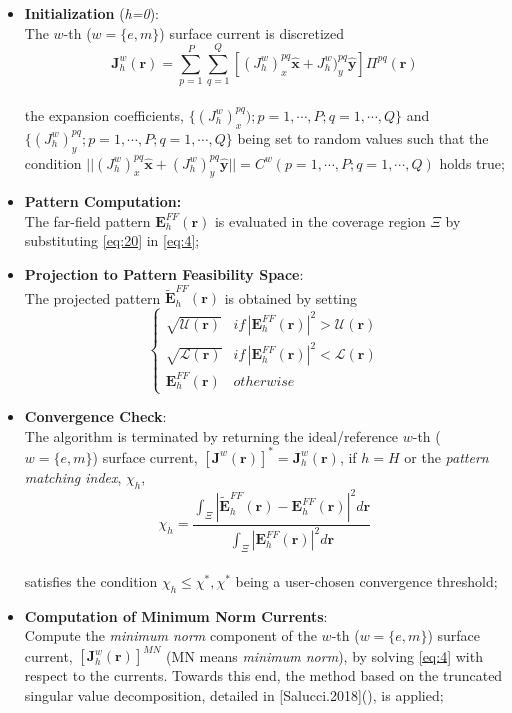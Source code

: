 \begin{itemize}
\item \textbf{Initialization} (\emph{h=0}):\\
The $w$-th ($w=\{ e,m\}$) surface current is discretized\begin{equation}
\mathbf{J}_{h}^{w}(\mathbf{r})=\sum_{p=1}^{P}\sum_{q=1}^{Q}[(J_{h}^{w})_{x}^{pq}\mathbf{\hat{x}}+J_{h}^{w})_{y}^{pq}\mathbf{\hat{y}}]\Pi^{pq}(\mathbf{r})\label{eq:20}\end{equation}
\\
the expansion coefficients, $\{(J_{h}^{w})_{x}^{pq});p=1,\cdots,P;q=1,\cdots,Q\}$
and $\{(J_{h}^{w})_{y}^{pq};p=1,\cdots,P;q=1,\cdots,Q\}$ being set
to random values such that the condition $||(J_{h}^{w})_{x}^{pq}\mathbf{\hat{x}}+(J_{h}^{w})_{y}^{pq}\mathbf{\hat{y}}||=C^{w}(p=1,\cdots,P;q=1,\cdots,Q)$
holds true;
\item \textbf{Pattern Computation:}\\
The far-field pattern $\mathbf{E}_{h}^{FF}(\mathbf{r})$ is evaluated
in the coverage region $\Xi$ by substituting \ref{eq:20} in \ref{eq:4};
\item \textbf{Projection to Pattern Feasibility Space}:\\
The projected pattern $\mathbf{\tilde{E}}_{h}^{FF}(\mathbf{r})$ is
obtained by setting \begin{equation}
\left\{ \begin{array}{cc}
\sqrt{\mathcal{U}(\mathbf{r})} & if\,|\mathbf{E}_{h}^{FF}(\mathbf{r})|^{2}>\mathcal{U}(\mathbf{r})\\
\sqrt{\mathcal{L}(\mathbf{r})} & if\,|\mathbf{E}_{h}^{FF}(\mathbf{r})|^{2}<\mathcal{L}(\mathbf{r})\\
\mathbf{\mathbf{E}}_{h}^{FF}(\mathbf{r}) & otherwise\end{array}\right.\label{eq:21}\end{equation}

\item \textbf{Convergence Check}:\\
The algorithm is terminated by returning the ideal/reference $w$-th
($w=\{ e,m\}$) surface current, $[\mathbf{J}^{w}(\mathbf{r})]^{*}=\mathbf{J}_{h}^{w}(\mathbf{r})$,
if $h=H$ or the \emph{pattern matching index}, $\chi_{h}$,\begin{equation}
\chi_{h}=\frac{\int_{\Xi}|\mathbf{\tilde{E}}_{h}^{FF}(\mathbf{r})-\mathbf{E}_{h}^{FF}(\mathbf{r})|^{2}d\mathbf{r}}{\int_{\Xi}|\mathbf{E}_{h}^{FF}(\mathbf{r})|^{2}d\mathbf{r}}\label{eq:22}\end{equation}
\\
satisfies the condition $\chi_{h}\leq\chi^{*},\chi^{*}$ being a user-chosen
convergence threshold;
\item \textbf{Computation of Minimum Norm Currents}:\\
Compute the \emph{minimum norm} component of the $w$-th ($w=\{ e,m\}$)
surface current, $[\mathbf{J}_{h}^{w}(\mathbf{r})]^{MN}$ (MN means
\emph{minimum norm}), by solving \ref{eq:4} with respect to the currents.
Towards this end, the method based on the truncated singular value
decomposition, detailed in {[}Salucci.2018{]}(\cite{Salucci:2018}),
is applied;
\end{itemize}
